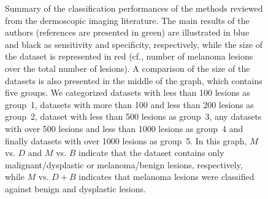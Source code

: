 \begin{figure}
{
}

\caption[Summary of the literature]{\small{Summary of the classification performances of the methods reviewed from the dermoscopic imaging literature.
The main results of the authors (references are presented in {\color{dgreen} green}) are illustrated in {\color{blue}blue} and black as sensitivity and specificity, respectively, while the size of the dataset is represented in {\color{red}red} (cf., number of melanoma lesions over the total number of lesions).
A comparison of the size of the datasets is also presented in the middle of the graph, which contains five groups.
We categorized datasets with less than 100 lesions as group~1, datasets with more than 100 and less than 200 lesions as group~2, dataset with less than 500 lesions as group~3, any datasets with over 500 lesions and less than 1000 lesions as group~4 and finally datasets with over 1000 lesions as group~5.
In this graph, $M$ vs. $D$ and $M$ vs. $B$ indicate that the dataset contains only malignant/dysplastic or melanoma/benign lesions, respectively, while $M$ vs. $D+B$ indicates that melanoma lesions were classified against benign and dysplastic lesions.}} 
\label{fig:dermoscopy_Sens_PerformanceComparison}
\end{figure}
